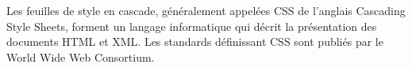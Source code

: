 \begin{minipage}{0.2\textwidth}
	\begin{minipage}{\linewidth}
			\label{f3}%
	\end{minipage}
\end{minipage}
\hfill
\begin{minipage}{0.75\textwidth}
	Les feuilles de style en cascade, généralement appelées CSS de l'anglais Cascading Style Sheets, forment un langage informatique qui décrit la présentation des documents HTML et XML. Les standards définissant CSS sont publiés par le World Wide Web Consortium.\\
\end{minipage}\\
\begin{minipage}{0.28\textwidth}
	\begin{minipage}{\linewidth}
			\label{f3}%
	\end{minipage}
\end{minipage}
